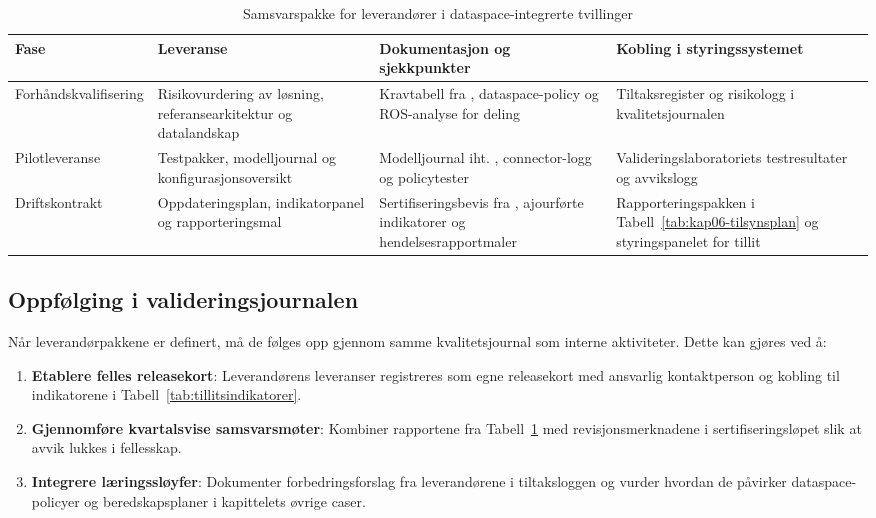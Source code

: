 \begin{table}[ht]
    \centering
    \caption{Samsvarspakke for leverand\o{}rer i dataspace-integrerte tvillinger}
    \label{tab:leverandor-samsvar}
    \begin{tabular}{|p{3.0cm}|p{4.9cm}|p{4.6cm}|p{3.1cm}|}
        \hline
        \textbf{Fase} & \textbf{Leveranse} & \textbf{Dokumentasjon og sjekkpunkter} & \textbf{Kobling i styringssystemet} \\
        \hline
        Forhåndskvalifisering & Risikovurdering av løsning, referansearkitektur og datalandskap & Kravtabell fra \citet{dfo2024anskaffelseki}, dataspace-policy og ROS-analyse for deling \citep{digdir2024datasamarbeid} & Tiltaksregister og risikologg i kvalitetsjournalen \\
        \hline
        Pilotleveranse & Testpakker, modelljournal og konfigurasjonsoversikt & Modelljournal iht. \citet{digdir2023modelljournal}, connector-logg og policytester \citep{idsa2023operational} & Valideringslaboratoriets testresultater og avvikslogg \\
        \hline
        Driftskontrakt & Oppdateringsplan, indikatorpanel og rapporteringsmal & Sertifiseringsbevis fra \citet{dnv2023digitalassurance}, ajourførte indikatorer og hendelsesrapportmaler & Rapporteringspakken i Tabell~\ref{tab:kap06-tilsynsplan} og styringspanelet for tillit \\
        \hline
    \end{tabular}
\end{table}

\subsection{Oppf\o{}lging i valideringsjournalen}
Når leverandørpakkene er definert, må de følges opp gjennom samme kvalitetsjournal som interne aktiviteter. Dette kan gjøres ved å:
\begin{enumerate}
    \item \textbf{Etablere felles releasekort}: Leverandørens leveranser registreres som egne releasekort med ansvarlig kontaktperson og kobling til indikatorene i Tabell~\ref{tab:tillitsindikatorer}.\citep{digdir2023modelljournal,digdir2023styringai}
    \item \textbf{Gjennomføre kvartalsvise samsvarsmøter}: Kombiner rapportene fra Tabell~\ref{tab:leverandor-samsvar} med revisjonsmerknadene i sertifiseringsløpet slik at avvik lukkes i fellesskap.\citep{dnv2023digitalassurance}
    \item \textbf{Integrere læringssløyfer}: Dokumenter forbedringsforslag fra leverandørene i tiltaksloggen og vurder hvordan de påvirker dataspace-policyer og beredskapsplaner i kapittelets øvrige caser.\citep{digdir2024datasamarbeid}
\end{enumerate}

